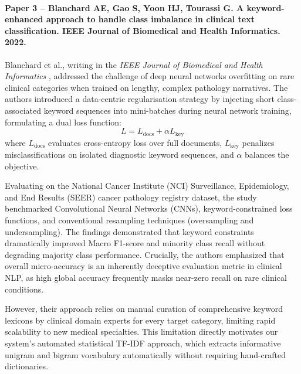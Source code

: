 \paragraph{Paper 3 -- Blanchard AE, Gao S, Yoon HJ, Tourassi G. A keyword-enhanced approach to handle class imbalance in clinical text classification. IEEE Journal of Biomedical and Health Informatics. 2022.}

Blanchard et al., writing in the \textit{IEEE Journal of Biomedical and Health Informatics} \cite{blanchard2022}, addressed the challenge of deep neural networks overfitting on rare clinical categories when trained on lengthy, complex pathology narratives. The authors introduced a data-centric regularisation strategy by injecting short class-associated keyword sequences into mini-batches during neural network training, formulating a dual loss function:
\begin{equation}
L = L_{\text{docs}} + \alpha L_{\text{key}}
\end{equation}
where $L_{\text{docs}}$ evaluates cross-entropy loss over full documents, $L_{\text{key}}$ penalizes misclassifications on isolated diagnostic keyword sequences, and $\alpha$ balances the objective.

Evaluating on the National Cancer Institute (NCI) Surveillance, Epidemiology, and End Results (SEER) cancer pathology registry dataset, the study benchmarked Convolutional Neural Networks (CNNs), keyword-constrained loss functions, and conventional resampling techniques (oversampling and undersampling). The findings demonstrated that keyword constraints dramatically improved Macro F1-score and minority class recall without degrading majority class performance. Crucially, the authors emphasized that overall micro-accuracy is an inherently deceptive evaluation metric in clinical NLP, as high global accuracy frequently masks near-zero recall on rare clinical conditions.

However, their approach relies on manual curation of comprehensive keyword lexicons by clinical domain experts for every target category, limiting rapid scalability to new medical specialties. This limitation directly motivates our system's automated statistical TF-IDF approach, which extracts informative unigram and bigram vocabulary automatically without requiring hand-crafted dictionaries.

